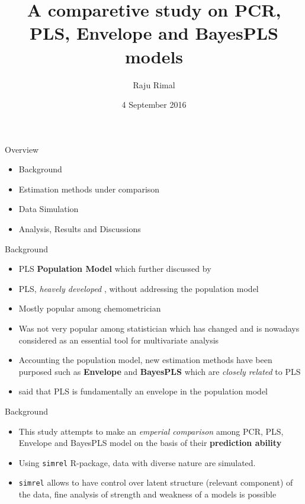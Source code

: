 \documentclass[ignorenonframetext,]{beamer}
\title{A comparetive study on PCR, PLS, Envelope and BayesPLS models}
\author{Raju Rimal}
\institute{\textbf{Supervisors}\\
Solve Sæbø, Tryge Almøy\\
\&\\
\textbf{Joint work with}\\
Inge Halland, UiO}
\date{4 September 2016}
\providecommand{\tightlist}{%
  \setlength{\itemsep}{0pt}\setlength{\parskip}{0pt}}
\begin{document}
\frame{\titlepage}

\begin{frame}{Overview}

\begin{itemize}
\tightlist
\item
  Background
\item
  Estimation methods under comparison
\item
  Data Simulation
\item
  Analysis, Results and Discussions
\end{itemize}

\end{frame}

\begin{frame}{Background}

\begin{itemize}
\tightlist
\item
  PLS \textbf{Population Model} \citep{helland1990partial} which further
  discussed by \citep{naes1993relevant, helland2001some}
\item
  PLS, \emph{heavely developed}
  \citep{wold1985partial, naes1993relevant, de1993simpls}, without
  addressing the population model \citep{cook2013envelopes}
\item
  Mostly popular among chemometrician
\item
  Was not very popular among statistician which has changed and is
  nowadays considered as an essential tool for multivariate analysis
\item
  Accounting the population model, new estimation methods have been
  purposed such as \textbf{Envelope}
  \citep{cook2010envelope, cook2016algorithms} and \textbf{BayesPLS}
  \citep{helland2012near} which are \emph{closely related} to PLS
\item
  \citet{cook2013envelopes} said that PLS is fundamentally an envelope
  in the population model
\end{itemize}

\end{frame}

\begin{frame}[fragile]{Background}

\begin{itemize}
\tightlist
\item
  This study attempts to make an \emph{emperial comparison} among PCR,
  PLS, Envelope and BayesPLS model on the basis of their
  \textbf{prediction ability}
\item
  Using \texttt{simrel} \citep{saebo2015simrel} R-package, data with
  diverse nature are simulated.
\item
  \texttt{simrel} allows to have control over latent structure (relevant
  component) of the data, fine analysis of strength and weakness of a
  models is possible
\end{itemize}

\end{frame}
\end{document}
